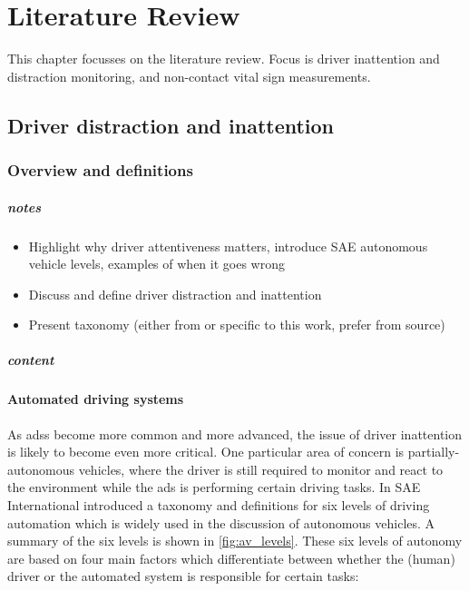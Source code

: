 \documentclass[11pt, parskip=half*,twoside=false]{scrbook}
\begin{document}
\chapter{Literature Review} \label{ch:litreview}
This chapter focusses on the literature review. Focus is driver inattention and distraction monitoring, and non-contact vital sign measurements.

\section{Driver distraction and inattention} \label{sec:distraction}

\subsection{Overview and definitions} \label{ssec:overview}
\paragraph{notes}
\begin{itemize}
	\item Highlight why driver attentiveness matters, introduce SAE autonomous vehicle levels, examples of when it goes wrong
	\item Discuss and define driver distraction and inattention
	\item Present taxonomy (either from \citep{reganDriverDistractionDriver2011} or specific to this work, prefer from source)
\end{itemize}

\paragraph{content}

\subsubsection{Automated driving systems}
As \glspl{ads} become more common and more advanced, the issue of driver inattention is likely to become even more critical. One particular area of concern is partially-autonomous vehicles, where the driver is still required to monitor and react to the environment while the \gls{ads} is performing certain driving tasks.  In \citep{J3016_201806} SAE International introduced a taxonomy and definitions for six levels of driving automation which is widely used in the discussion of autonomous vehicles. A summary of the six levels is shown in \cref{fig:av_levels}. These six levels of autonomy are based on four main factors which differentiate between whether the (human) driver or the automated system is responsible for certain tasks: 
\end{document}

